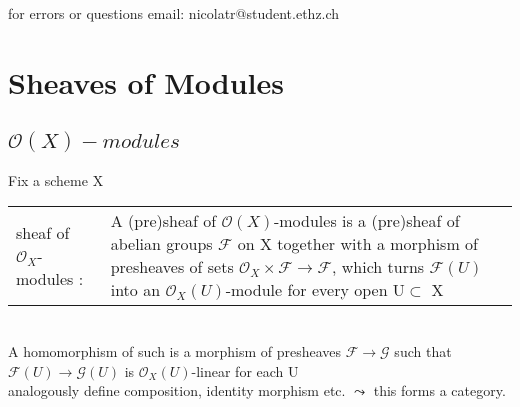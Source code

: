 \documentclass[a4paper, 12pt]{article}
\newcommand{\ca}[1]{\mathcal{#1}}
\newcommand{\oxmods}{$\mathcal{O}_X$-modules }
\begin{document}
\setcounter{section}{4}

for errors or questions email: nicolatr@student.ethz.ch

\section{Sheaves of Modules}
\subsection{$\mathcal{O}(X)-modules$}
Fix a scheme X
\\






\begin{tabular}{p{4cm} p{11cm}}


sheaf of \oxmods: & A (pre)sheaf of  $\mathcal{O}(X)$-modules is a (pre)sheaf of abelian groups $\mathcal{F}$ on X together with a morphism of presheaves of sets $\mathcal{O}_X\times\mathcal{F}\longrightarrow\mathcal{F}$, which turns $\mathcal{F}(U)$ into an $\mathcal{O}_X(U)$-module for every open U$\subset$ X
\\

\end{tabular}
\\

A homomorphism of such is a morphism of presheaves $\mathcal{F}\rightarrow\mathcal{G}$ such that $\mathcal{F}(U)\rightarrow\mathcal{G}(U)$ is $\ca{O}_X(U)$-linear for each U
\\

analogously define composition, identity morphism etc. $\leadsto$ this forms a category.
\\
\end{document}
